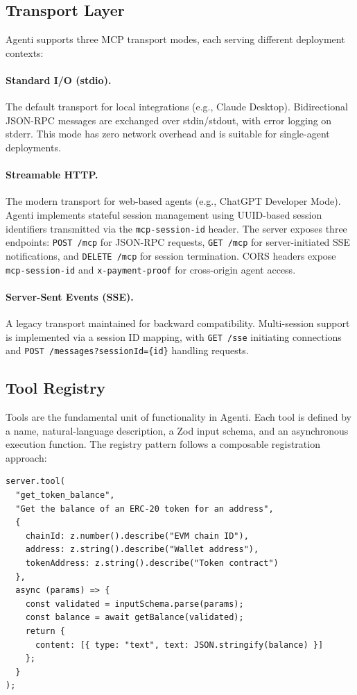 \documentclass[11pt]{article}
\begin{document}
\subsection{Transport Layer}

Agenti supports three MCP transport modes, each serving different deployment contexts:

\paragraph{Standard I/O (stdio).} The default transport for local integrations (e.g., Claude Desktop). Bidirectional JSON-RPC messages are exchanged over stdin/stdout, with error logging on stderr. This mode has zero network overhead and is suitable for single-agent deployments.

\paragraph{Streamable HTTP.} The modern transport for web-based agents (e.g., ChatGPT Developer Mode). Agenti implements stateful session management using UUID-based session identifiers transmitted via the \texttt{mcp-session-id} header. The server exposes three endpoints: \texttt{POST /mcp} for JSON-RPC requests, \texttt{GET /mcp} for server-initiated SSE notifications, and \texttt{DELETE /mcp} for session termination. CORS headers expose \texttt{mcp-session-id} and \texttt{x-payment-proof} for cross-origin agent access.

\paragraph{Server-Sent Events (SSE).} A legacy transport maintained for backward compatibility. Multi-session support is implemented via a session ID mapping, with \texttt{GET /sse} initiating connections and \texttt{POST /messages?sessionId=\{id\}} handling requests.

\subsection{Tool Registry}

Tools are the fundamental unit of functionality in Agenti. Each tool is defined by a name, natural-language description, a Zod input schema, and an asynchronous execution function. The registry pattern follows a composable registration approach:

\begin{lstlisting}[caption={Tool registration pattern in Agenti.},label={lst:toolreg}]
server.tool(
  "get_token_balance",
  "Get the balance of an ERC-20 token for an address",
  {
    chainId: z.number().describe("EVM chain ID"),
    address: z.string().describe("Wallet address"),
    tokenAddress: z.string().describe("Token contract")
  },
  async (params) => {
    const validated = inputSchema.parse(params);
    const balance = await getBalance(validated);
    return {
      content: [{ type: "text", text: JSON.stringify(balance) }]
    };
  }
);
\end{lstlisting}
\end{document}
